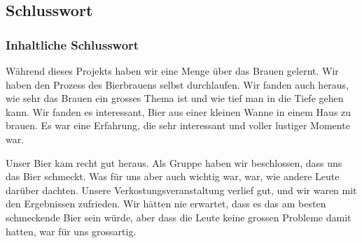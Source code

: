 \subsection{Schlusswort}
\subsubsection{Inhaltliche Schlusswort}
Während dieses Projekts haben wir eine Menge über das Brauen gelernt. Wir haben den Prozess des Bierbrauens selbst durchlaufen. Wir fanden auch heraus, wie sehr das Brauen ein grosses Thema ist und wie tief man in die Tiefe gehen kann. Wir fanden es interessant, Bier aus einer kleinen Wanne in einem Haus zu brauen. Es war eine Erfahrung, die sehr interessant und voller lustiger Momente war. 

Unser Bier kam recht gut heraus.
 Als Gruppe haben wir beschlossen, dass uns das Bier schmeckt. 
 Was für uns aber auch wichtig war, war, wie andere Leute darüber dachten.
  Unsere Verkostungsveranstaltung verlief gut, und wir waren mit den Ergebnissen zufrieden.
   Wir hätten nie erwartet, dass es das am besten schmeckende Bier sein würde, aber dass die Leute 
   keine grossen Probleme damit hatten, war für uns grossartig.

